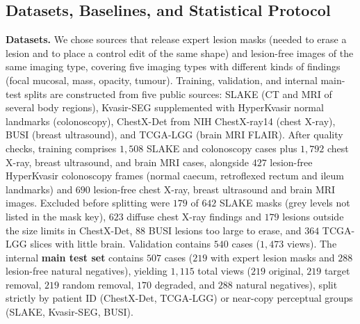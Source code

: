 \documentclass[5p,times,twocolumn,authoryear]{elsarticle}
\begin{document}
\subsection{Datasets, Baselines, and Statistical Protocol}
\label{subsec:exp_setup}
\textbf{Datasets.} We chose sources that release expert lesion masks (needed to erase a lesion and to place a control edit of the same shape) and lesion-free images of the same imaging type, covering five imaging types with different kinds of findings (focal mucosal, mass, opacity, tumour). Training, validation, and internal main-test splits are constructed from five public sources: SLAKE \citep{liu2021slake} (CT and MRI of several body regions), Kvasir-SEG \citep{jha2020kvasir} supplemented with HyperKvasir \citep{borgli2020hyperkvasir} normal landmarks (colonoscopy), ChestX-Det \citep{liu2020chestxdet} from NIH ChestX-ray14 (chest X-ray), BUSI \citep{al2020dataset} (breast ultrasound), and TCGA-LGG \citep{buda2019association} (brain MRI FLAIR). After quality checks, training comprises $1,508$ SLAKE and colonoscopy cases plus $1,792$ chest X-ray, breast ultrasound, and brain MRI cases, alongside $427$ lesion-free HyperKvasir colonoscopy frames (normal caecum, retroflexed rectum and ileum landmarks) and $690$ lesion-free chest X-ray, breast ultrasound and brain MRI images. Excluded before splitting were $179$ of $642$ SLAKE masks (grey levels not listed in the mask key), $623$ diffuse chest X-ray findings and $179$ lesions outside the size limits in ChestX-Det, $88$ BUSI lesions too large to erase, and $364$ TCGA-LGG slices with little brain. Validation contains $540$ cases ($1,473$ views). The internal \textbf{main test set} contains $507$ cases ($219$ with expert lesion masks and $288$ lesion-free natural negatives), yielding $1,115$ total views ($219$ original, $219$ target removal, $219$ random removal, $170$ degraded, and $288$ natural negatives), split strictly by patient ID (ChestX-Det, TCGA-LGG) or near-copy perceptual groups (SLAKE, Kvasir-SEG, BUSI).
\end{document}
